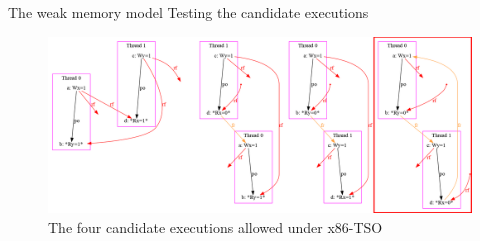 \documentclass{beamer}
\begin{document}
\begin{frame}{The weak memory model} {Testing the candidate executions}
\vspace{10pt}
\begin{minipage}{.3\linewidth}
\hfill
\end{minipage}
%
\noindent\begin{minipage}{.4\linewidth}
\end{minipage}
%
\vspace{-5pt}
\begin{figure}
\centering
\includegraphics[width=\linewidth]{img/candidate-red.png}
\caption{The four candidate executions allowed under x86-TSO}
\end{figure}

\end{frame}
\end{document}
